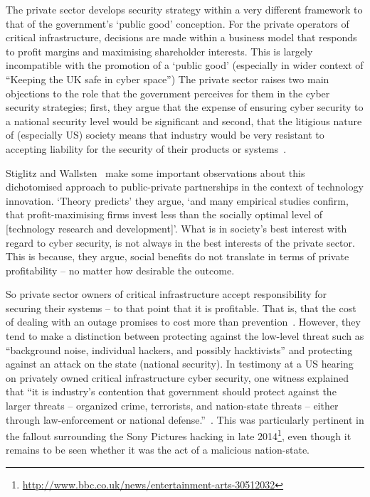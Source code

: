 \documentclass[a4paper,11pt]{article}
\begin{document}
The private sector develops security strategy within a very different
framework to that of the government's `public good' conception. For
the private operators of critical infrastructure, decisions are made
within a business model that responds to profit margins and maximising
shareholder interests. This is largely incompatible with the promotion
of a `public good' (especially in wider context of ``Keeping the UK
safe in cyber space''\cite{keepingukcybersafe:2014}) The private
sector raises two main objections to the role that the government
perceives for them in the cyber security strategies; first, they argue
that the expense of ensuring cyber security to a national security
level would be significant and second, that the litigious nature of
(especially US) society means that industry would be very resistant to
accepting liability for the security of their products or
systems~\cite{paller:2005}.

Stiglitz and Wallsten~\cite{stiglitz+wallsten:1999} make some
important observations about this dichotomised approach to
public-private partnerships in the context of technology
innovation. `Theory predicts' they argue, `and many empirical studies
confirm, that profit-maximising firms invest less than the socially
optimal level of [technology research and development]'. What is in
society's best interest with regard to cyber security, is not always
in the best interests of the private sector. This is because, they
argue, social benefits do not translate in terms of private
profitability -- no matter how desirable the outcome.

So private sector owners of critical infrastructure accept
responsibility for securing their systems -- to that point that it is
profitable. That is, that the cost of dealing with an outage promises
to cost more than
prevention~\cite{bisinfosecbreaches:2014,cybergovhealthcheck:2014}. However,
they tend to make a distinction between protecting against the
low-level threat such as ``background noise, individual hackers, and
possibly hacktivists'' and protecting against an attack on the state
(national security). In testimony at a US hearing on privately owned
critical infrastructure cyber security, one witness explained that
``it is industry's contention that government should protect against
the larger threats -- organized crime, terrorists, and nation-state
threats -- either through law-enforcement or national
defense.''~\cite{vanardo:2005}. This was particularly pertinent in the
fallout surrounding the Sony Pictures hacking in late
2014\footnote{\url{http://www.bbc.co.uk/news/entertainment-arts-30512032}},
even though it remains to be seen whether it was the act of a
malicious nation-state.
\end{document}
